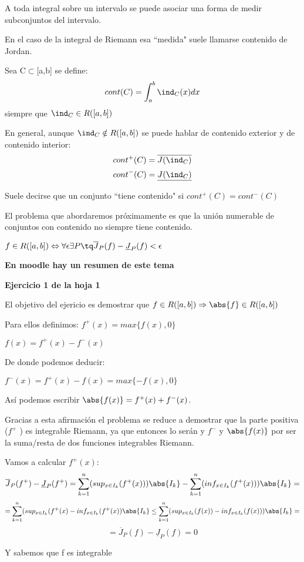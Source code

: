 \documentclass{apuntes}
\begin{document}
\begin{defn}[Contenido]
A toda integral sobre un intervalo se puede asociar una forma de medir subconjuntos del intervalo.

En el caso de la integral de Riemann esa ``medida" suele llamarse contenido de Jordan.

Sea C$\subset$[a,b] se define:
\[cont(C) = \int_a^b \ind_{C}(x) dx\]
siempre que $\ind_C \in R([a,b])$

En general, aunque $\ind_C \notin R([a,b])$ se puede hablar de contenido exterior y de contenido interior:
\[cont^+(C)=\overline{J(\ind_C)}\]
\[cont^-(C)=\underline{J(\ind_C)}\]

Suele decirse que un conjunto ``tiene contenido" si $cont^+(C)=cont^-(C)$
\end{defn}

El problema que abordaremos próximamente es que la unión numerable de conjuntos con contenido no siempre tiene contenido.

\obs $f\in R([a,b]) \Leftrightarrow \forall \epsilon \exists P \tq \overline{J}_P(f)-\underline{J}_P(f) < \epsilon$


\textbf{En moodle hay un resumen de este tema}

\begin{example}
\textbf{Ejercicio 1 de la hoja 1}

El objetivo del ejericio es demostrar que $f\in R([a,b]) \Rightarrow \abs{f}\in R([a,b])$

Para ellos definimos: 
$f^+(x) = max\lbrace f(x), 0 \rbrace$

$f(x) = f^+(x) - f^-(x)$

De donde podemos deducir:

$f^-(x) = f^+(x)-f(x)=max \lbrace -f(x), 0 \rbrace$

Así podemos escribir 
$\abs{f(x)} = f^+(x)+f^-(x)$.

Gracias a esta afirmación el problema se reduce a demostrar que la parte positiva ($f^+$ ) es integrable Riemann, ya que entonces lo serán  y $f^-$  y $\abs{f(x)}$  por ser la suma/resta de dos funciones integrables Riemann.

Vamos a calcular $f^+(x)$:
\[\overline{J}_P(f^+)-\underline{J}_P(f^+) = \sum_{k=1}^n(sup_{x\in I_k}(f^+(x)))\abs{I_k} - \sum_{k=1}^n(inf_{x\in I_k}(f^+(x)))\abs{I_k}=\]
\[= \sum_{k=1}^n(sup_{x\in I_k}(f^+(x)-inf_{x\in I_k}(f^+(x))\abs{I_k} \leq \sum_{k=1}^n(sup_{x\in I_k}(f(x))-inf_{x\in I_k}(f(x)))\abs{I_k} =\] \[=\overline{J}_P(f)-\underline{J}_P(f) = 0\]

Y sabemos que f es integrable
\end{example}
\end{document}

